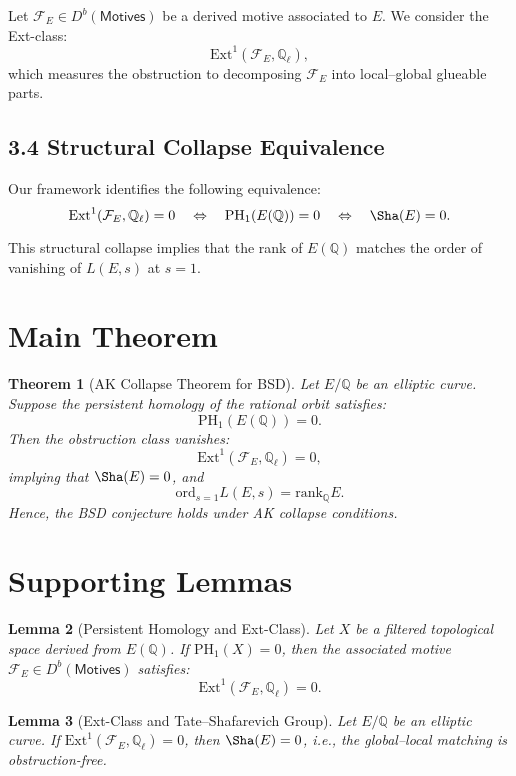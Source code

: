 \documentclass[11pt]{article}
\newtheorem{theorem}{Theorem}[section]
\newtheorem{lemma}[theorem]{Lemma}
\theoremstyle{definition}
\begin{document}
Let \( \mathcal{F}_E \in D^b(\mathsf{Motives}) \) be a derived motive associated to \( E \).  
We consider the Ext-class:
\[
\mathrm{Ext}^1(\mathcal{F}_E, \mathbb{Q}_\ell),
\]
which measures the obstruction to decomposing \( \mathcal{F}_E \) into local–global glueable parts.

\subsection{3.4 Structural Collapse Equivalence}

Our framework identifies the following equivalence:
\[
\mathrm{Ext}^1(\mathcal{F}_E, \mathbb{Q}_\ell) = 0 \quad \Leftrightarrow \quad \mathrm{PH}_1(E(\mathbb{Q})) = 0 \quad \Leftrightarrow \quad \Sha(E) = 0.
\]

This structural collapse implies that the rank of \( E(\mathbb{Q}) \) matches the order of vanishing of \( L(E,s) \) at \( s=1 \).

\section{Main Theorem}

\begin{theorem}[AK Collapse Theorem for BSD]
Let \( E/\mathbb{Q} \) be an elliptic curve.  
Suppose the persistent homology of the rational orbit satisfies:
\[
\mathrm{PH}_1(E(\mathbb{Q})) = 0.
\]
Then the obstruction class vanishes:
\[
\mathrm{Ext}^1(\mathcal{F}_E, \mathbb{Q}_\ell) = 0,
\]
implying that \( \Sha(E) = 0 \), and
\[
\mathrm{ord}_{s=1}L(E,s) = \mathrm{rank}_\mathbb{Q}E.
\]
Hence, the BSD conjecture holds under AK collapse conditions.
\end{theorem}

\section{Supporting Lemmas}

\begin{lemma}[Persistent Homology and Ext-Class]
Let \( X \) be a filtered topological space derived from \( E(\mathbb{Q}) \).  
If \( \mathrm{PH}_1(X) = 0 \), then the associated motive \( \mathcal{F}_E \in D^b(\mathsf{Motives}) \) satisfies:
\[
\mathrm{Ext}^1(\mathcal{F}_E, \mathbb{Q}_\ell) = 0.
\]
\end{lemma}

\begin{lemma}[Ext-Class and Tate–Shafarevich Group]
Let \( E/\mathbb{Q} \) be an elliptic curve.  
If \( \mathrm{Ext}^1(\mathcal{F}_E, \mathbb{Q}_\ell) = 0 \), then \( \Sha(E) = 0 \), i.e., the global–local matching is obstruction-free.
\end{lemma}
\end{document}
